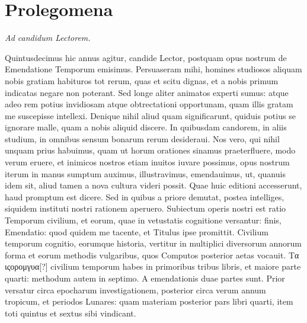

\chapter{Prolegomena}

\em{Ad candidum Lectorem.}

\normalfont{}

Quintusdecimus hic annus agitur, candide
Lector, postquam opus nostrum de
Emendatione Temporum emisimus.
Persuaseram
mihi, homines studiosos aliquam nobis
gratiam habituros tot rerum, quas et scitu
dignas, et a nobis primum indicatas negare
non poterant.
Sed longe aliter animatos experti
sumus: atque adeo rem potius invidiosam
atque obtrectationi opportunam, quam illis gratam me suscepisse
intellexi.
Denique nihil aliud quam significarunt, quiduis potius
se ignorare malle, quam a nobis aliquid discere.
In quibusdam
candorem, in aliis studium, in omnibus sensum bonarum rerum desideraui.
Nos vero, qui nihil unquam prius habuimus, quam ut horum
orationes sinamus praeterfluere, modo verum eruere, et inimicos
nostros etiam inuitos iuvare possimus, opus nostrum iterum in
manus sumptum auximus, illustravimus, emendauimus, ut, quanuis
idem sit, aliud tamen a nova cultura videri possit.
Quae huic editioni
accesserunt, haud promptum est dicere.
Sed in quibus a priore demutat,
postea intelliges, siquidem instituti nostri rationem aperuero.
Subiectum operis nostri est ratio Temporum civilium, et eorum,
quae in vetustatis cognitione versantur: finis, Emendatio: quod quidem
me tacente, et Titulus ipse promittit.
Civilium temporum cognitio,
eorumque historia, vertitur in multiplici diversorum annorum
forma et eorum methodis vulgaribus, quos Computos posterior
aetas vocauit.
\textgreek{Τα ιςορομγυα[?]} civilium temporum habes in primoribus
tribus libris, et maiore parte quarti: methodum autem in septimo.
A emendationis duae partes sunt.
{}
Prior versatur circa epocharum
investigationem, posterior circa verum annum tropicum, 
et periodos Lunares: quam materiam posterior pars libri quarti,
item toti quintus et sextus sibi vindicant.


